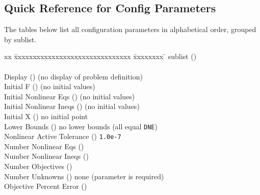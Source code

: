 \clearpage
\subsection{Quick Reference for Config Parameters}
\label{subconfig:QUICKREF}

The tables below list all configuration parameters in alphabetical order,
grouped by sublist.

\begin{tabbing}
  xx \= xxxxxxxxxxxxxxxxxxxxxxxxxxxxxxx \= xxxxxxxx \= \kill
   sublist ()  \\
                 
        \\

  \>Display                            ()
       (no display of problem definition)  \\
  \>Initial F                          ()
       (no initial values)  \\
  \>Initial Nonlinear Eqs              ()
       (no initial values)  \\
  \>Initial Nonlinear Ineqs            ()
       (no initial values)  \\
  \>Initial X                          ()
      \>no initial point  \\
  \>Lower Bounds                       ()
      \>no lower bounds (all equal {\tt DNE})  \\
  \>Nonlinear Active Tolerance         ()
      \> {\tt 1.0e-7}  \\
  \>Number Nonlinear Eqs               ()
        \\
  \>Number Nonlinear Ineqs             ()
        \\
  \>Number Objectives                  ()
        \\
  \>Number Unknowns                    ()
      \> none (parameter is required)  \\
  \>Objective Percent Error            ()

\end{tabbing}
